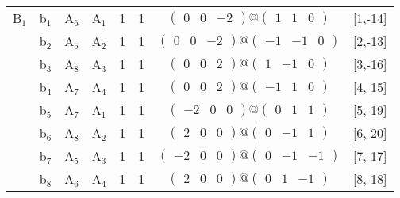 \documentclass[fleqn,10pt,landscape]{article}
\begin{document}
\begin{itemize}
\begin{center}
\begin{longtable}{cc|cc|c|c|c|l}
B$_{1}$ & b$_{1}$ & A$_{6}$ & A$_{1}$ & 1 & 1 & $\begin{pmatrix} 0 & 0 & -2 \end{pmatrix}@\begin{pmatrix} 1 & 1 & 0 \end{pmatrix}$ & [1,-14] \\
& b$_{2}$ & A$_{5}$ & A$_{2}$ & 1 & 1 & $\begin{pmatrix} 0 & 0 & -2 \end{pmatrix}@\begin{pmatrix} -1 & -1 & 0 \end{pmatrix}$ & [2,-13] \\
& b$_{3}$ & A$_{8}$ & A$_{3}$ & 1 & 1 & $\begin{pmatrix} 0 & 0 & 2 \end{pmatrix}@\begin{pmatrix} 1 & -1 & 0 \end{pmatrix}$ & [3,-16] \\
& b$_{4}$ & A$_{7}$ & A$_{4}$ & 1 & 1 & $\begin{pmatrix} 0 & 0 & 2 \end{pmatrix}@\begin{pmatrix} -1 & 1 & 0 \end{pmatrix}$ & [4,-15] \\
& b$_{5}$ & A$_{7}$ & A$_{1}$ & 1 & 1 & $\begin{pmatrix} -2 & 0 & 0 \end{pmatrix}@\begin{pmatrix} 0 & 1 & 1 \end{pmatrix}$ & [5,-19] \\
& b$_{6}$ & A$_{8}$ & A$_{2}$ & 1 & 1 & $\begin{pmatrix} 2 & 0 & 0 \end{pmatrix}@\begin{pmatrix} 0 & -1 & 1 \end{pmatrix}$ & [6,-20] \\
& b$_{7}$ & A$_{5}$ & A$_{3}$ & 1 & 1 & $\begin{pmatrix} -2 & 0 & 0 \end{pmatrix}@\begin{pmatrix} 0 & -1 & -1 \end{pmatrix}$ & [7,-17] \\
& b$_{8}$ & A$_{6}$ & A$_{4}$ & 1 & 1 & $\begin{pmatrix} 2 & 0 & 0 \end{pmatrix}@\begin{pmatrix} 0 & 1 & -1 \end{pmatrix}$ & [8,-18] \\

\end{longtable}
\end{center}
\end{itemize}
\end{document}
